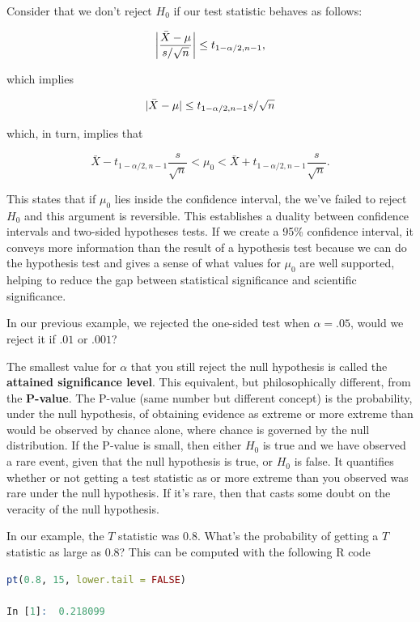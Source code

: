 \documentclass{homework}
\begin{document}
Consider that we don't reject $H_0$ if our test statistic behaves as follows:

$$
\bigg|\frac{\Bar{X}-\mu}{s/\sqrt{n}}\bigg| \leq t_{1-\alpha/2, n-1},
$$

which implies 

$$
|\Bar{X}-\mu| \leq t_{1-\alpha/2, n-1} s/\sqrt{n}
$$

which, in turn, implies that 

$$
\bar{X} - t_{1-\alpha/2, n-1} \frac{s}{\sqrt{n}} < \mu_0 < \bar{X} + t_{1-\alpha/2, n-1} \frac{s}{\sqrt{n}}.
$$

This states that if $\mu_0$ lies inside the confidence interval, the we've failed to reject $H_0$ and this argument is reversible. This establishes a duality between confidence intervals and two-sided hypotheses tests. If we create a 95\% confidence interval, it conveys more information than the result of a hypothesis test because we can do the hypothesis test and gives a sense of what values for $\mu_0$ are well supported, helping to reduce the gap between statistical significance and scientific significance. 

In our previous example, we rejected the one-sided test when $\alpha = .05$, would we reject it if $.01$ or $.001$?

The smallest value for $\alpha$ that you still reject the null hypothesis is called the \textbf{attained significance level}. This equivalent, but philosophically different, from the \textbf{P-value}.
The P-value (same number but different concept) is the probability, under the null hypothesis, of obtaining evidence as extreme or more extreme than would be observed by chance alone, where chance is governed by the null distribution. If the P-value is small, then either $H_0$ is true and we have observed a rare event, given that the null hypothesis is true, or $H_0$ is false. It quantifies whether or not getting a test statistic as or more extreme than you observed was rare under the null hypothesis. If it's rare, then that casts some doubt on the veracity of the null hypothesis. 

In our example, the $T$ statistic was $0.8$. What's the probability of getting a $T$ statistic as large as $0.8$? This can be computed with the following R code 

\begin{lstlisting}[language=R]
pt(0.8, 15, lower.tail = FALSE) 

In [1]:  0.218099
\end{lstlisting}
\end{document}
